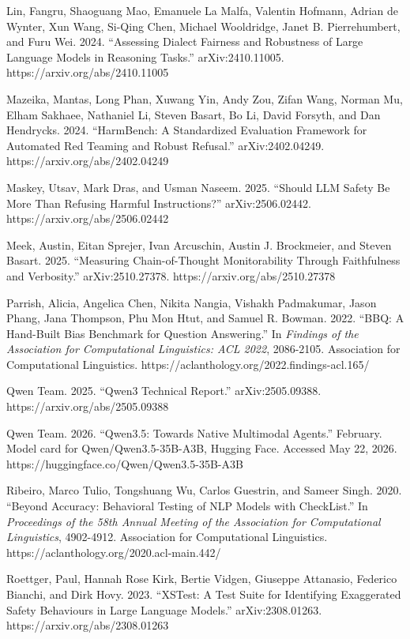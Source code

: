 \documentclass[
  letterpaper,
  11pt]{article}
\begin{document}
Lin, Fangru, Shaoguang Mao, Emanuele La Malfa, Valentin Hofmann, Adrian
de Wynter, Xun Wang, Si-Qing Chen, Michael Wooldridge, Janet B.
Pierrehumbert, and Furu Wei. 2024. ``Assessing Dialect Fairness and
Robustness of Large Language Models in Reasoning Tasks.''
arXiv:2410.11005. https://arxiv.org/abs/2410.11005

Mazeika, Mantas, Long Phan, Xuwang Yin, Andy Zou, Zifan Wang, Norman Mu,
Elham Sakhaee, Nathaniel Li, Steven Basart, Bo Li, David Forsyth, and
Dan Hendrycks. 2024. ``HarmBench: A Standardized Evaluation Framework
for Automated Red Teaming and Robust Refusal.'' arXiv:2402.04249.
https://arxiv.org/abs/2402.04249

Maskey, Utsav, Mark Dras, and Usman Naseem. 2025. ``Should LLM Safety Be
More Than Refusing Harmful Instructions?'' arXiv:2506.02442.
https://arxiv.org/abs/2506.02442

Meek, Austin, Eitan Sprejer, Ivan Arcuschin, Austin J. Brockmeier, and
Steven Basart. 2025. ``Measuring Chain-of-Thought Monitorability Through
Faithfulness and Verbosity.'' arXiv:2510.27378.
https://arxiv.org/abs/2510.27378

Parrish, Alicia, Angelica Chen, Nikita Nangia, Vishakh Padmakumar, Jason
Phang, Jana Thompson, Phu Mon Htut, and Samuel R. Bowman. 2022. ``BBQ: A
Hand-Built Bias Benchmark for Question Answering.'' In \emph{Findings of
the Association for Computational Linguistics: ACL 2022}, 2086-2105.
Association for Computational Linguistics.
https://aclanthology.org/2022.findings-acl.165/

Qwen Team. 2025. ``Qwen3 Technical Report.'' arXiv:2505.09388.
https://arxiv.org/abs/2505.09388

Qwen Team. 2026. ``Qwen3.5: Towards Native Multimodal Agents.''
February. Model card for Qwen/Qwen3.5-35B-A3B, Hugging Face. Accessed
May 22, 2026. https://huggingface.co/Qwen/Qwen3.5-35B-A3B

Ribeiro, Marco Tulio, Tongshuang Wu, Carlos Guestrin, and Sameer Singh.
2020. ``Beyond Accuracy: Behavioral Testing of NLP Models with
CheckList.'' In \emph{Proceedings of the 58th Annual Meeting of the
Association for Computational Linguistics}, 4902-4912. Association for
Computational Linguistics. https://aclanthology.org/2020.acl-main.442/

Roettger, Paul, Hannah Rose Kirk, Bertie Vidgen, Giuseppe Attanasio,
Federico Bianchi, and Dirk Hovy. 2023. ``XSTest: A Test Suite for
Identifying Exaggerated Safety Behaviours in Large Language Models.''
arXiv:2308.01263. https://arxiv.org/abs/2308.01263
\end{document}
